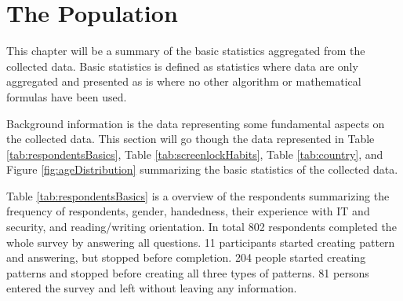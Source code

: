 \section{The Population} \label{sec:basicstatistics}
  
  This chapter will be a summary of the basic statistics aggregated from the collected data. Basic statistics is defined as statistics where data are only aggregated and presented as is where no other algorithm or mathematical formulas have been used.

  Background information is the data representing some fundamental aspects on the collected data. This section will go though the data represented in Table \ref{tab:respondentsBasics}, Table \ref{tab:screenlockHabits}, Table \ref{tab:country}, and Figure \ref{fig:ageDistribution} summarizing the basic statistics of the collected data. 

  Table \ref{tab:respondentsBasics} is a overview of the respondents summarizing the frequency of respondents, gender, handedness, their experience with IT and security, and reading/writing orientation. In total 802 respondents completed the whole survey by answering all questions. 11 participants started creating pattern and answering, but stopped before completion. 204 people started creating patterns and stopped before creating all three types of patterns. 81 persons entered the survey and left without leaving any information. 

